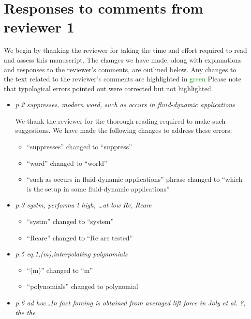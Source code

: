 \documentclass[]{article}
\begin{document}
\section*{Responses to comments from reviewer 1}

We begin by thanking the reviewer for taking the time and effort
required to read and assess this manuscript. The changes we have made, along with explanations and
responses to the reviewer's comments, are outlined below. Any changes to the text related to the reviewer's comments are highlighted in
\textcolor{green}{green} Please note that typological errors pointed out were corrected but not highlighted.

\begin{itemize}
\item \emph{p.2	suppresses,	modern word, such as occurs in fluid-dynamic applications}

We thank the reviewer for the thorough reading required to make such suggestions. We have made the following changes to address these errors:
\begin{itemize}
\item ``suppresses'' changed to ``suppress''
\item ``word'' changed to ``world''
\item ``such as occurs in fluid-dynamic applications'' phrase changed to ``which is the setup in some fluid-dynamic applications''
\end{itemize}

\item \emph{p.3	systm,	performa	t high,	…at	low	Re,	Reare}

\begin{itemize}
\item ``systm'' changed to ``system''
\item ``Reare'' changed to ``Re are tested''
\end{itemize}

\item \emph{p.5	eq.1,(m),interpolating polynomials}

\begin{itemize}
\item ``(m)'' changed to ``m''
\item ``polynomials'' changed to polynomial
\end{itemize}

\item \emph{p.6	ad hoc…In fact forcing is obtained from	averaged lift force	in Joly et al. ?, the the}


\end{itemize}
\end{document}
